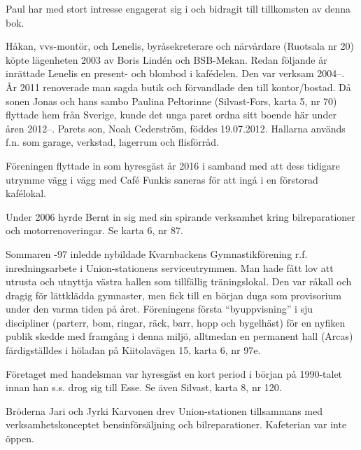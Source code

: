 Paul har med stort intresse engagerat sig i och bidragit till tillkomsten av denna bok.






Håkan, vvs-montör, och Lenelis, byråsekreterare och närvårdare (Ruotsala nr 20) köpte lägenheten 2003 av Boris Lindén och BSB-Mekan. Redan följande år inrättade Lenelis en present- och blombod 	i kafédelen. Den var verksam 2004--. År 2011 renoverade man sagda butik och förvandlade den till	kontor/bostad. Då sonen Jonas och hans sambo Paulina Peltorinne	(Silvast-Fors, karta 5, nr 70) flyttade hem från Sverige, kunde det unga paret ordna sitt boende här under åren 2012--. Parets son, Noah Cederström, föddes 19.07.2012.
Hallarna används f.n. som garage, verkstad, lagerrum och flisförråd.



Föreningen flyttade in som hyresgäst år 2016 i samband med att dess tidigare utrymme vägg i vägg med Café Funkis saneras för att ingå i en förstorad kafélokal.\jhvspace{}


Under 2006 hyrde Bernt in sig med sin spirande verksamhet kring bilreparationer och motorrenoveringar. Se karta 6, nr 87.\jhvspace{}


Sommaren -97 inledde nybildade Kvarnbackens Gymnastikförening r.f. inredningsarbete i Union-stationens serviceutrymmen. Man hade fått lov att utrusta och utnyttja västra hallen som tillfällig träningslokal. Den var råkall och dragig för lättklädda gymnaster, men fick till en början duga som provisorium under den varma tiden på året. Föreningens första	``byuppvisning'' i sju discipliner (parterr, bom, ringar, räck, barr, hopp 	och bygelhäst) för en nyfiken publik skedde med framgång i denna miljö, alltmedan en permanent hall (Arcas) färdigställdes i höladan på Kiitolavägen 15, karta 6, nr 97e.


Företaget med handelsman  var hyresgäst en kort period i början på 1990-talet innan han s.s. drog sig till Esse. Se även Silvast, karta 8, nr 120.\jhvspace{}


Bröderna Jari och Jyrki Karvonen drev Union-stationen tillsammans med verksamhetskonceptet bensinförsäljning och bilreparationer. Kafeterian var inte öppen.\jhvspace{}


